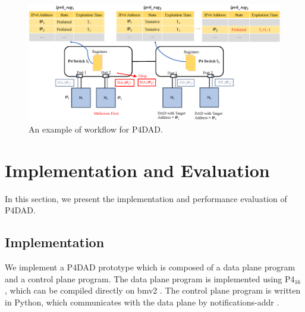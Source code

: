\documentclass[a4paper,fleqn]{cas-dc}
\begin{document}
        \begin{figure}
            \centerline{
                \includegraphics[scale=0.56]{figure/Workflow.eps}
            }
            \vspace{-0.3cm}
            \caption{An example of workflow for P4DAD.}
            \label{fig:P4DAD-Workflow}
            \vspace{-0.3cm}
        \end{figure}







\section{Implementation and Evaluation}\label{sec:implementation and evaluation}
    In this section, we present the implementation and performance evaluation of P4DAD. 
    
    \subsection{Implementation}
        We implement a P4DAD prototype which is composed of a data plane program and a control plane program. The data plane program is implemented using P4$_{16}$ \cite{P4-16}, which can be compiled directly on bmv2 \cite{bmv2}. The control plane program is written in Python, which communicates with the data plane by notifications-addr \cite{bmv2}.
\end{document}
